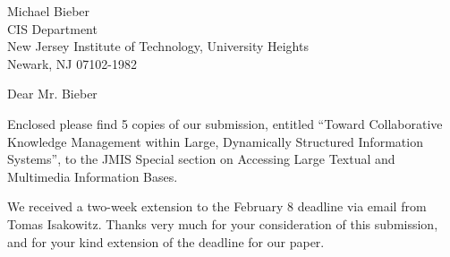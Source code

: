 

\makelabels


\signature {Philip Johnson}

\address{548 Kaimake Loop\\
         Kailua, HI 96734}
\indentclosing

\begin {letter}
  {Michael Bieber\\
   CIS Department\\
   New Jersey Institute of Technology, University Heights\\
   Newark, NJ 07102-1982}

\opening {Dear Mr. Bieber}

Enclosed please find 5 copies of our submission, entitled ``Toward
Collaborative Knowledge Management within Large, Dynamically Structured
Information Systems'', to the JMIS Special section on Accessing Large Textual
and Multimedia Information Bases.

We received a two-week extension to the February 8 deadline via email from
Tomas Isakowitz. Thanks very much for your consideration of this submission,
and for your kind extension of the deadline for our paper.

\end{letter}

